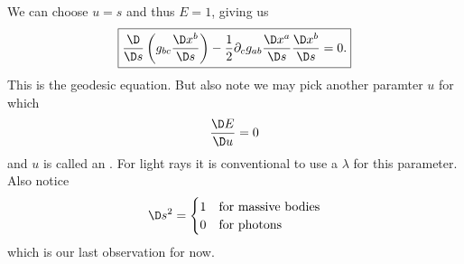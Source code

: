 We can choose $u=s$ and thus $E=1$, giving us
\begin{equation}
\boxed{
\frac{\D}{\D s}
\left(g_{bc}\frac{\D x^{b}}{\D s}\right)
-\frac{1}{2}\partial_{c}g_{ab}\frac{\D x^{a}}{\D s}\frac{\D x^{b}}{\D s}=0.
}
\end{equation}
This is the geodesic equation. But also note we may pick another
paramter $u$ for which
\begin{equation}
\frac{\D E}{\D u}=0
\end{equation}
and $u$ is called an . For light rays it
is conventional to use a $\lambda$ for this parameter. Also
notice
\begin{equation}
\D s^{2}=\begin{cases}
1&\mbox{for massive bodies}\\
0&\mbox{for photons}
\end{cases}
\end{equation}
which is our last observation for now.
